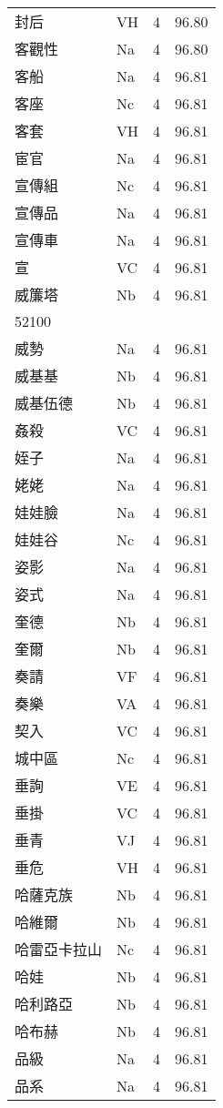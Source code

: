 \documentclass[twocolumn]{book}
\begin{document}
\begin{supertabular}{llrr}
封后 & VH & 4 &  96.80\\
客觀性 & Na & 4 &  96.80\\
客船 & Na & 4 &  96.81\\
客座 & Nc & 4 &  96.81\\
客套 & VH & 4 &  96.81\\
宦官 & Na & 4 &  96.81\\
宣傳組 & Nc & 4 &  96.81\\
宣傳品 & Na & 4 &  96.81\\
宣傳車 & Na & 4 &  96.81\\
宣 & VC & 4 &  96.81\\
威簾塔 & Nb & 4 &  96.81\\
52100\\
威勢 & Na & 4 &  96.81\\
威基基 & Nb & 4 &  96.81\\
威基伍德 & Nb & 4 &  96.81\\
姦殺 & VC & 4 &  96.81\\
姪子 & Na & 4 &  96.81\\
姥姥 & Na & 4 &  96.81\\
娃娃臉 & Na & 4 &  96.81\\
娃娃谷 & Nc & 4 &  96.81\\
姿影 & Na & 4 &  96.81\\
姿式 & Na & 4 &  96.81\\
奎德 & Nb & 4 &  96.81\\
奎爾 & Nb & 4 &  96.81\\
奏請 & VF & 4 &  96.81\\
奏樂 & VA & 4 &  96.81\\
契入 & VC & 4 &  96.81\\
城中區 & Nc & 4 &  96.81\\
垂詢 & VE & 4 &  96.81\\
垂掛 & VC & 4 &  96.81\\
垂青 & VJ & 4 &  96.81\\
垂危 & VH & 4 &  96.81\\
哈薩克族 & Nb & 4 &  96.81\\
哈維爾 & Nb & 4 &  96.81\\
哈雷亞卡拉山 & Nc & 4 &  96.81\\
哈娃 & Nb & 4 &  96.81\\
哈利路亞 & Nb & 4 &  96.81\\
哈布赫 & Nb & 4 &  96.81\\
品級 & Na & 4 &  96.81\\
品系 & Na & 4 &  96.81\\

\end{supertabular}
\end{document}
